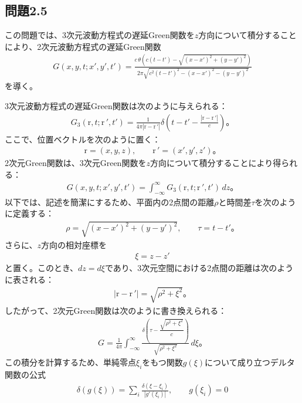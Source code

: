 \documentclass[platex,dvipdfmx,a4paper]{jsarticle}
\newcommand{\vect}[1]{\boldsymbol{\mathrm{#1}}}
\begin{document}
  \subsection*{問題2.5}

  この問題では、3次元波動方程式の遅延Green関数を$z$方向について積分することにより、2次元波動方程式の遅延Green関数
  \begin{align*}
    G(x,y,t;x',y',t')
    =
    \frac{c\,\theta\!\left(c(t-t')-\sqrt{(x-x')^2+(y-y')^2}\right)}
    {2\pi\sqrt{c^2(t-t')^2-(x-x')^2-(y-y')^2}}
  \end{align*}
  を導く。
  
  3次元波動方程式の遅延Green関数は次のように与えられる：
  \begin{align*}
    G_3(\vect{r},t;\vect{r}\,',t')
    =
    \frac{1}{4\pi|\vect{r}-\vect{r}\,'|}
    \delta\left(t-t'-\frac{|\vect{r}-\vect{r}\,'|}{c}\right)。
  \end{align*}
  ここで、位置ベクトルを次のように置く：
  \begin{align*}
    \vect{r}=(x,y,z),
    \qquad
    \vect{r}\,'=(x',y',z')。
  \end{align*}
  2次元Green関数は、3次元Green関数を$z$方向について積分することにより得られる：
  \begin{align*}
    G(x,y,t;x',y',t')
    =
    \int_{-\infty}^{\infty}G_3(\vect{r},t;\vect{r}\,',t')\,dz。
  \end{align*}
  以下では、記述を簡潔にするため、平面内の2点間の距離$\rho$と時間差$\tau$を次のように定義する：
  \begin{align*}
    \rho=\sqrt{(x-x')^2+(y-y')^2},
    \qquad
    \tau=t-t'。
  \end{align*}
  さらに、$z$方向の相対座標を
  \begin{align*}
    \xi=z-z'
  \end{align*}
  と置く。このとき、$dz=d\xi$であり、3次元空間における2点間の距離は次のように表される：
  \begin{align*}
    |\vect{r}-\vect{r}\,'|=\sqrt{\rho^2+\xi^2}。
  \end{align*}
  したがって、2次元Green関数は次のように書き換えられる：
  \begin{align*}
    G
    =
    \frac{1}{4\pi}
    \int_{-\infty}^{\infty}
    \frac{\delta\left(\tau-\dfrac{\sqrt{\rho^2+\xi^2}}{c}\right)}
    {\sqrt{\rho^2+\xi^2}}\,d\xi。
  \end{align*}
  この積分を計算するため、単純零点$\xi_i$をもつ関数$g(\xi)$について成り立つデルタ関数の公式
  \begin{align*}
    \delta(g(\xi))
    =
    \sum_i\frac{\delta(\xi-\xi_i)}{|g'(\xi_i)|},
    \qquad
    g(\xi_i)=0
  \end{align*}
\end{document}

